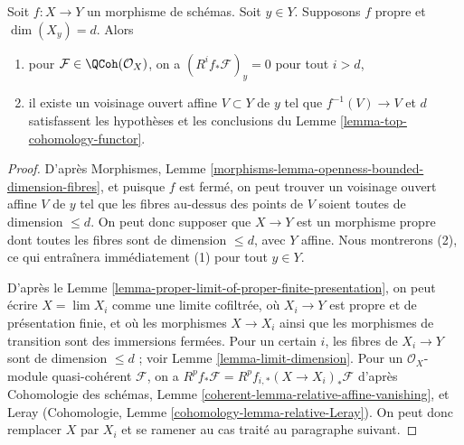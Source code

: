 \begin{lemma}
\label{lemma-higher-direct-images-zero-above-dimension-fibre}
Soit $f : X \to Y$ un morphisme de schémas. Soit $y \in Y$.
Supposons $f$ propre et $\dim(X_y) = d$.
Alors
\begin{enumerate}
\item pour $\mathcal{F} \in \QCoh(\mathcal{O}_X)$,
on a $(R^if_*\mathcal{F})_y = 0$ pour tout $i > d$,
\item il existe un voisinage ouvert affine $V \subset Y$
de $y$ tel que $f^{-1}(V) \to V$ et $d$ satisfassent les
hypothèses et les conclusions du Lemme \ref{lemma-top-cohomology-functor}.
\end{enumerate}
\end{lemma}

\begin{proof}
D'après Morphismes, Lemme
\ref{morphisms-lemma-openness-bounded-dimension-fibres},
et puisque $f$ est fermé, on peut trouver un voisinage ouvert affine
$V$ de $y$ tel que les fibres au-dessus des points de $V$ soient toutes de dimension
$\leq d$. On peut donc supposer que $X \to Y$ est un morphisme propre dont
toutes les fibres sont de dimension $\leq d$, avec $Y$ affine.
Nous montrerons (2), ce qui entraînera immédiatement (1)
pour tout $y \in Y$.

\medskip\noindent
D'après le Lemme \ref{lemma-proper-limit-of-proper-finite-presentation},
on peut écrire $X = \lim X_i$ comme une limite cofiltrée, où $X_i \to Y$ est propre
et de présentation finie, et où les morphismes $X \to X_i$
ainsi que les morphismes de transition sont des immersions fermées.
Pour un certain $i$, les fibres de $X_i \to Y$ sont de dimension $\leq d$ ;
voir Lemme \ref{lemma-limit-dimension}.
Pour un $\mathcal{O}_X$-module quasi-cohérent $\mathcal{F}$, on a
$R^pf_*\mathcal{F} = R^pf_{i, *}(X \to X_i)_*\mathcal{F}$ d'après
Cohomologie des schémas, Lemme \ref{coherent-lemma-relative-affine-vanishing},
et Leray (Cohomologie, Lemme \ref{cohomology-lemma-relative-Leray}).
On peut donc remplacer $X$ par $X_i$ et
se ramener au cas traité au paragraphe suivant.


\end{proof}
